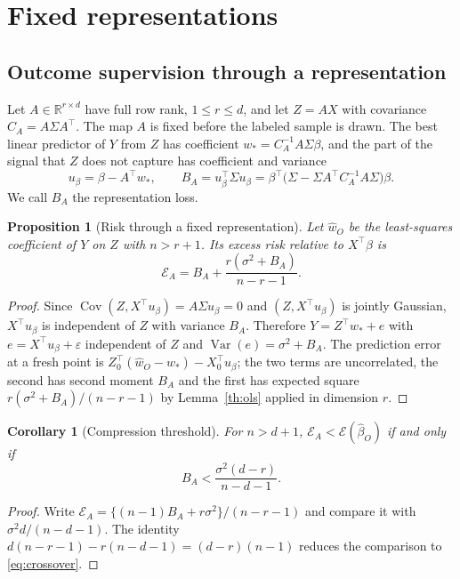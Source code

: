 \documentclass[11pt]{article}
\newtheorem{proposition}[theorem]{Proposition}
\newtheorem{corollary}[theorem]{Corollary}
\theoremstyle{remark}
\newcommand{\Var}{\operatorname{Var}}
\newcommand{\Cov}{\operatorname{Cov}}
\newcommand{\R}{\mathbb R}
\newcommand{\1}{\mathbf 1}
\begin{document}
\section{Fixed representations}\label{sec:rep}
\subsection{Outcome supervision through a representation}
Let $A\in\R^{r\times d}$ have full row rank, $1\le r\le d$, and let $Z=AX$ with covariance $C_A=A\Sigma A^\top$. The map $A$ is fixed before the labeled sample is drawn. The best linear predictor of $Y$ from $Z$ has coefficient $w_*=C_A^{-1}A\Sigma\beta$, and the part of the signal that $Z$ does not capture has coefficient and variance
\begin{equation}\label{eq:resid}
 u_\beta=\beta-A^\top w_*,\qquad B_A=u_\beta^\top\Sigma u_\beta
 =\beta^\top\big(\Sigma-\Sigma A^\top C_A^{-1}A\Sigma\big)\beta .
\end{equation}
We call $B_A$ the representation loss.

\begin{proposition}[Risk through a fixed representation]\label{th:rep}
Let $\widehat w_O$ be the least-squares coefficient of $Y$ on $Z$ with $n>r+1$. Its excess risk relative to $X^\top\beta$ is
\begin{equation}\label{eq:reprisk}
\mathcal E_A=B_A+\frac{r(\sigma^2+B_A)}{n-r-1}.
\end{equation}
\end{proposition}
\begin{proof}
Since $\Cov(Z,X^\top u_\beta)=A\Sigma u_\beta=0$ and $(Z,X^\top u_\beta)$ is jointly Gaussian, $X^\top u_\beta$ is independent of $Z$ with variance $B_A$. Therefore $Y=Z^\top w_*+e$ with $e=X^\top u_\beta+\varepsilon$ independent of $Z$ and $\Var(e)=\sigma^2+B_A$. The prediction error at a fresh point is $Z_0^\top(\widehat w_O-w_*)-X_0^\top u_\beta$; the two terms are uncorrelated, the second has second moment $B_A$ and the first has expected square $r(\sigma^2+B_A)/(n-r-1)$ by Lemma~\ref{th:ols} applied in dimension $r$.
\end{proof}

\begin{corollary}[Compression threshold]\label{cor:crossover}
For $n>d+1$, $\mathcal E_A<\mathcal E(\widehat\beta_O)$ if and only if
\begin{equation}\label{eq:crossover}
 B_A<\frac{\sigma^2(d-r)}{n-d-1}.
\end{equation}
\end{corollary}
\begin{proof}
Write $\mathcal E_A=\{(n-1)B_A+r\sigma^2\}/(n-r-1)$ and compare it with $\sigma^2d/(n-d-1)$. The identity $d(n-r-1)-r(n-d-1)=(d-r)(n-1)$ reduces the comparison to \eqref{eq:crossover}.
\end{proof}
\end{document}
